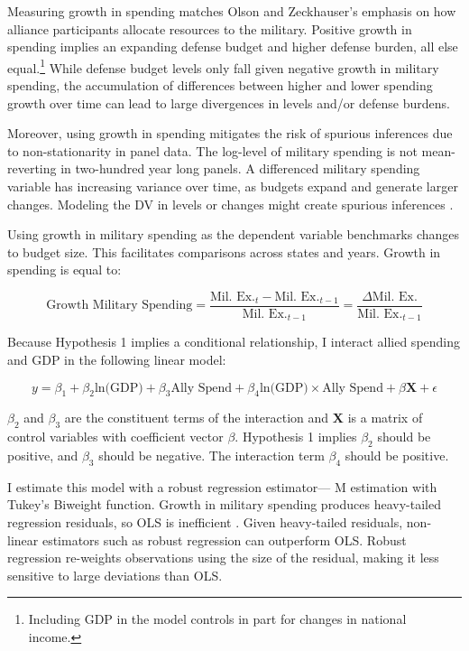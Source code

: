\documentclass[12pt]{article}
\begin{document}
Measuring growth in spending matches Olson and Zeckhauser's emphasis on how alliance participants allocate resources to the military.
Positive growth in spending implies an expanding defense budget and higher defense burden, all else equal.\footnote{Including GDP in the model controls in part for changes in national income.} 
While defense budget levels only fall given negative growth in military spending, the accumulation of differences between higher and lower spending growth over time can lead to large divergences in levels and/or defense burdens. 


Moreover, using growth in spending mitigates the risk of spurious inferences due to non-stationarity in panel data. 
The log-level of military spending is not mean-reverting in two-hundred year long panels.
A differenced military spending variable has increasing variance over time, as budgets expand and generate larger changes. 
Modeling the DV in levels or changes might create spurious inferences \citep{GrangerNewbold1974}. 


Using growth in military spending as the dependent variable benchmarks changes to budget size. 
This facilitates comparisons across states and years. 
Growth in spending is equal to: 


\begin{equation}
\mbox{Growth Military Spending} = \frac{\mbox{Mil. Ex.}_t - \mbox{Mil. Ex.}_{t-1} }{ \mbox{Mil. Ex.}_{t-1} } = \frac{\Delta \mbox{Mil. Ex.} }{ \mbox{Mil. Ex.}_{t-1} }
\end{equation} 


Because Hypothesis 1 implies a conditional relationship, I interact allied spending and GDP in the following linear model:

\begin{equation} 
y = \beta_1 + \beta_2 \mbox{ln(GDP)} + \beta_3 \mbox{Ally Spend} + \beta_4 \mbox{ln(GDP)} \times \mbox{Ally Spend} + \beta \mathbf{X} + \epsilon
\end{equation}


$\beta_2$ and $\beta_3$ are the constituent terms of the interaction and \textbf{X} is a matrix of control variables with coefficient vector $\beta$.
Hypothesis 1 implies $\beta_2$ should be positive, and $\beta_3$ should be negative. 
The interaction term $\beta_4$ should be positive. 


I estimate this model with a robust regression estimator--- M estimation with Tukey's Biweight function. 
Growth in military spending produces heavy-tailed regression residuals, so OLS is inefficient \citep{RaineyBaissa2018}. 
Given heavy-tailed residuals, non-linear estimators such as robust regression can outperform OLS. 
Robust regression re-weights observations using the size of the residual, making it less sensitive to large deviations than OLS. 
\end{document}
